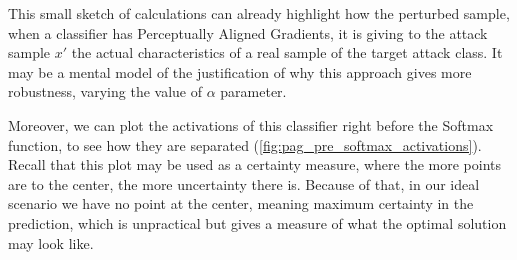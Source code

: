 \documentclass[../thesis.tex]{subfiles}
\begin{document}
This small sketch of calculations can already highlight how the perturbed sample, when a classifier has Perceptually Aligned Gradients,
it is giving to the attack sample $x'$ the actual characteristics of a real sample of the target attack class.
It may be a mental model of the justification of why this approach gives more robustness, varying the value of $\alpha$ parameter.

Moreover, we can plot the activations of this classifier right before the Softmax function, to see how they are separated (\cref{fig:pag_pre_softmax_activations}).
Recall that this plot may be used as a certainty measure, where the more points are to the center, the more uncertainty there is.
Because of that, in our ideal scenario we have no point at the center, meaning maximum certainty in the prediction, which is unpractical but gives a measure of what the optimal solution may look like.
\end{document}
